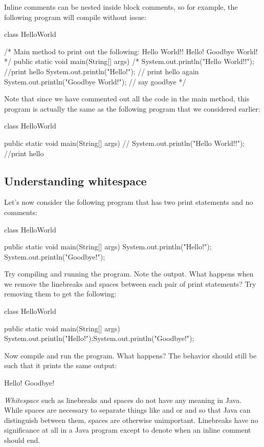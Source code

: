 Inline comments can be nested inside block comments, so for example, the following program will compile without issue:
\begin{code}
class HelloWorld {

    /* Main method to print out the following:
         Hello World!!
         Hello!
         Goodbye World!
    */
    public static void main(String[] args) {
        /*
        System.out.println("Hello World!!"); //print hello
        System.out.println("Hello!"); // print hello again
        System.out.println("Goodbye World!"); // say goodbye
        */
    }

}
\end{code}
Note that since we have commented out all the code in the main method, this program is actually the same as the following program that we considered earlier:
\begin{code}
class HelloWorld {

    public static void main(String[] args) {
//        System.out.println("Hello World!!"); //print hello
    }

}
\end{code}

\subsection{Understanding whitespace}

Let's now consider the following program that has two print statements and no comments:
\begin{code}
class HelloWorld {

    public static void main(String[] args) {
        System.out.println("Hello!");
        System.out.println("Goodbye!");
    }

}
\end{code}
Try compiling and running the program. Note the output. What happens when we remove the linebreaks and spaces between each pair of print statements?
Try removing them to get the following:
\begin{code}
class HelloWorld {

    public static void main(String[] args) {
        System.out.println("Hello!");System.out.println("Goodbye!");
    }

}
\end{code}
Now compile and run the program. What happens?
The behavior should still be such that it prints the same output:
\begin{code}
Hello!
Goodbye!
\end{code}
\emph{Whitespace} such as linebreaks and spaces do not have any meaning in Java. While spaces are necessary to separate things like  and  or  and 
so that Java can distinguish between them, spaces are otherwise unimportant. Linebreaks have no significance at all in a Java program except to denote when an inline comment should end.

